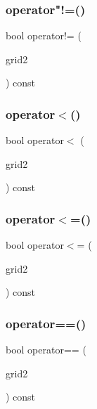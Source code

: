 \mbox{\label{classGrid_a9426f59b6352933578b4294bc9d221bc}} 
\subsubsection{\texorpdfstring{operator"!=()}{operator!=()}}
{\footnotesize\ttfamily bool operator!= (\begin{DoxyParamCaption}\item[{const \mbox{\hyperlink{classGrid}{Grid}}$<$ Value\+Type $>$ \&}]{grid2 }\end{DoxyParamCaption}) const}

\mbox{\label{classGrid_aefee1b5c152f0cf1b9537b2542f0fccd}} 
\subsubsection{\texorpdfstring{operator$<$()}{operator<()}}
{\footnotesize\ttfamily bool operator$<$ (\begin{DoxyParamCaption}\item[{const \mbox{\hyperlink{classGrid}{Grid}}$<$ Value\+Type $>$ \&}]{grid2 }\end{DoxyParamCaption}) const}

\mbox{\label{classGrid_adc972513ba66ac1e3e5847abe6e8666c}} 
\subsubsection{\texorpdfstring{operator$<$=()}{operator<=()}}
{\footnotesize\ttfamily bool operator$<$= (\begin{DoxyParamCaption}\item[{const \mbox{\hyperlink{classGrid}{Grid}}$<$ Value\+Type $>$ \&}]{grid2 }\end{DoxyParamCaption}) const}

\mbox{\label{classGrid_ae321d29c4eab96f54c2f86929a345e2b}} 
\subsubsection{\texorpdfstring{operator==()}{operator==()}}
{\footnotesize\ttfamily bool operator== (\begin{DoxyParamCaption}\item[{const \mbox{\hyperlink{classGrid}{Grid}}$<$ Value\+Type $>$ \&}]{grid2 }\end{DoxyParamCaption}) const}

